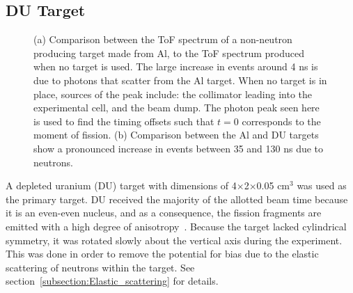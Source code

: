 \subsection{DU Target}
\label{subsection:targets}
\begin{figure}[]
\centering
    \caption{(a) Comparison between the ToF spectrum of a non-neutron producing target made from Al, to the ToF spectrum produced when no target is used.
    The large increase in events around 4 ns is due to photons that scatter from the Al target.
    When no target is in place, sources of the peak include: the collimator leading into the experimental cell, and the beam dump.
    The photon peak seen here is used to find the timing offsets such that $t=0$ corresponds to the moment of fission.
    (b) Comparison between the Al and DU targets show a pronounced increase in events between 35 and 130 ns due to neutrons.}
    \label{fig:ToF}
\end{figure}
A depleted uranium (DU) target with dimensions of 4$\times$2$\times$0.05 $\text{cm}^3$ was used as the primary target.
DU received the majority of the allotted beam time because it is an even-even nucleus, and as a consequence, the fission fragments are emitted with a high degree of anisotropy~\cite{1977FragAss}.
Because the target lacked cylindrical symmetry, it was rotated slowly about the vertical axis during the experiment.
This was done in order to remove the potential for bias due to the elastic scattering of neutrons within the target.
See section~\ref{subsection:Elastic_scattering} for details.

